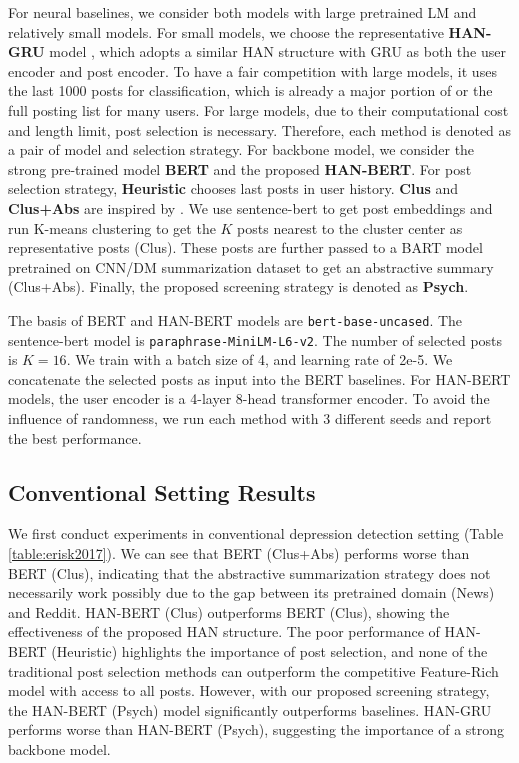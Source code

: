 For neural baselines, we consider both models with large pretrained LM and relatively small models. For small models, we choose the representative \textbf{HAN-GRU} model \cite{zogan2021explainable}, which adopts a similar HAN structure with GRU as both the user encoder and post encoder. To have a fair competition with large models, it uses the last 1000 posts for classification, which is already a major portion of or the full posting list for many users. For large models, due to their computational cost and length limit, post selection is necessary. Therefore, each method is denoted as a pair of model and selection strategy. For backbone model, we consider the strong pre-trained model \textbf{BERT} and the proposed \textbf{HAN-BERT}. For post selection strategy, \textbf{Heuristic} chooses last posts in user history. \textbf{Clus} and \textbf{Clus+Abs} are inspired by \cite{zogan2021depressionnet}. We use sentence-bert \cite{reimers-2019-sentence-bert} to get post embeddings and run K-means clustering to get the $K$ posts nearest to the cluster center as representative posts (Clus). These posts are further passed to a BART model \cite{lewis2020bart} pretrained on CNN/DM summarization dataset to get an abstractive summary (Clus+Abs). Finally, the proposed screening strategy is denoted as \textbf{Psych}. 

The basis of BERT and HAN-BERT models are \texttt{bert-base-uncased}. The sentence-bert model is \texttt{paraphrase-MiniLM-L6-v2}. The number of selected posts is $K=16$. We train with a batch size of 4, and learning rate of 2e-5. We concatenate the selected posts as input into the BERT baselines. For HAN-BERT models, the user encoder is a 4-layer 8-head transformer encoder. To avoid the influence of randomness, we run each method with 3 different seeds and report the best performance.


\subsection{Conventional Setting Results}
\label{sec:conventional}

We first conduct experiments in conventional depression detection setting (Table \ref{table:erisk2017}). We can see that BERT (Clus+Abs) performs worse than BERT (Clus), indicating that the abstractive summarization strategy does not necessarily work possibly due to the gap between its pretrained domain (News) and Reddit. HAN-BERT (Clus) outperforms BERT (Clus), showing the effectiveness of the proposed HAN structure. The poor performance of HAN-BERT (Heuristic) highlights the importance of post selection, and none of the traditional post selection methods can outperform the competitive Feature-Rich model with access to all posts. However, with our proposed screening strategy, the HAN-BERT (Psych) model significantly outperforms baselines. HAN-GRU performs worse than HAN-BERT (Psych), suggesting the importance of a strong backbone model.

